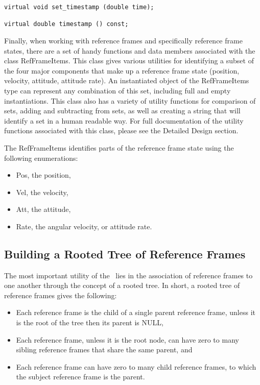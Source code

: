 \begin{verbatim}
virtual void set_timestamp (double time);

virtual double timestamp () const;
\end{verbatim}

Finally, when working with reference frames and specifically reference frame
states, there are a set of handy functions and data members associated with
the class RefFrameItems. This class gives various utilities for identifying
a subset of the four major components that make up a reference frame state
(position, velocity, attitude, attitude rate). An instantiated object of
the RefFrameItems type can represent any combination of this set, including
full and empty instantiations. This class also has a variety of utility
functions for comparison of sets, adding and subtracting from sets, as well
as creating a string that will identify a set in a human readable way. For
full documentation of the utility functions associated with this class,
please see the Detailed Design section.

The RefFrameItems identifies parts of the reference frame state using
the following enumerations:

\begin{itemize}
\item{Pos}, the position,
\item{Vel}, the velocity,
\item{Att}, the attitude,
\item{Rate}, the angular velocity, or attitude rate.
\end{itemize}

\subsection{Building a Rooted Tree of Reference Frames}

The most important utility of the \ lies in the association
of reference frames to one another through the concept of a rooted tree.
In short, a rooted tree of reference frames gives the following:

\begin{itemize}
\item{Each reference frame is the child of a single parent reference frame, unless
it is the root of the tree then its parent is NULL},
\item{Each reference frame, unless it is the root node, can have zero to many
sibling reference frames that share the same parent}, and
\item{Each reference frame can have zero to many child reference frames, to which
the subject reference frame is the parent}.
\end{itemize}

